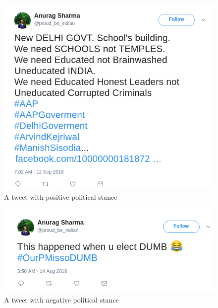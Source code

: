 \documentclass[a4paper,11pt]{article}
\begin{document}
\begin{figure}[h]
    \includegraphics[width=\linewidth]{pro.png}
    \caption{A tweet with positive political stance}
    \label{fig:example3}
\end{figure}

\begin{figure}[h]
    \includegraphics[width=\linewidth]{anti.png}
    \caption{A tweet with negative political stance}
    \label{fig:example4}
\end{figure}
\end{document}
